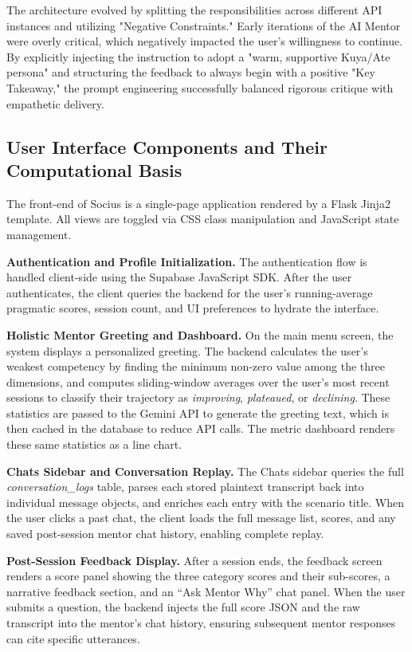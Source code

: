 The architecture evolved by splitting the responsibilities across different API instances and utilizing "Negative Constraints." Early iterations of the AI Mentor were overly critical, which negatively impacted the user's willingness to continue. By explicitly injecting the instruction to adopt a "warm, supportive Kuya/Ate persona" and structuring the feedback to always begin with a positive "Key Takeaway," the prompt engineering successfully balanced rigorous critique with empathetic delivery.

\subsection{User Interface Components and Their Computational Basis}
 
The front-end of Socius is a single-page application rendered by a Flask Jinja2 template. All views are toggled via CSS class manipulation and JavaScript state management. 
 
\textbf{Authentication and Profile Initialization.} The authentication flow is handled client-side using the Supabase JavaScript SDK. After the user authenticates, the client queries the backend for the user's running-average pragmatic scores, session count, and UI preferences to hydrate the interface.
 
\textbf{Holistic Mentor Greeting and Dashboard.} On the main menu screen, the system displays a personalized greeting. The backend calculates the user's weakest competency by finding the minimum non-zero value among the three dimensions, and computes sliding-window averages over the user's most recent sessions to classify their trajectory as \textit{improving}, \textit{plateaued}, or \textit{declining}. These statistics are passed to the Gemini API to generate the greeting text, which is then cached in the database to reduce API calls. The metric dashboard renders these same statistics as a line chart.
 
\textbf{Chats Sidebar and Conversation Replay.} The Chats sidebar queries the full \textit{conversation\_logs} table, parses each stored plaintext transcript back into individual message objects, and enriches each entry with the scenario title. When the user clicks a past chat, the client loads the full message list, scores, and any saved post-session mentor chat history, enabling complete replay.
 
\textbf{Post-Session Feedback Display.} After a session ends, the feedback screen renders a score panel showing the three category scores and their sub-scores, a narrative feedback section, and an ``Ask Mentor Why'' chat panel. When the user submits a question, the backend injects the full score JSON and the raw transcript into the mentor's chat history, ensuring subsequent mentor responses can cite specific utterances.
 
